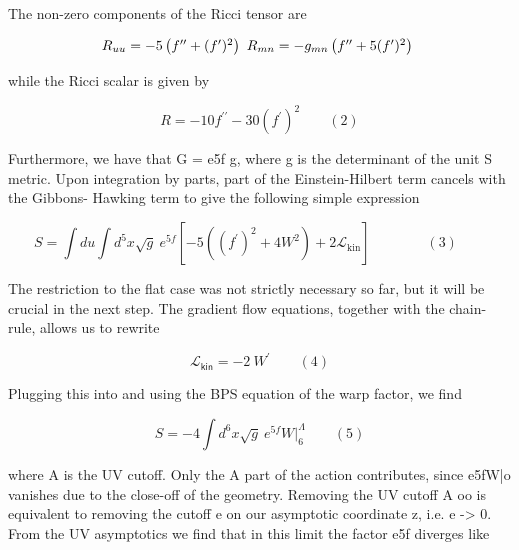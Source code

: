 \documentclass{article}
\begin{document}
\sloppy

The non-zero components of the Ricci tensor are


\begin{equation}
\begin{array} { c c c } { R _ { u u } = - 5 \left ( f ^ { \prime \prime } + ( f ^ { \prime } ) ^ { 2 } \right ) ~ R _ { m n } = - g _ { m n } \left ( f ^ { \prime \prime } + 5 ( f ^ { \prime } ) ^ { 2 } \right ) ~ }\end{array}
\end{equation}


while the Ricci scalar is given by


\begin{equation}
R = - 1 0 f ^ { \prime \prime } - 3 0 ( f ^ { \prime } ) ^ { 2 } \qquad ( 2 )
\end{equation}


Furthermore, we have that G = e5f g, where g is the determinant of the unit S metric.
Upon integration by parts, part of the Einstein-Hilbert term cancels with the Gibbons-
Hawking term to give the following simple expression


\begin{equation}
S = \int d u \int d ^ { 5 } x \sqrt { g } ~ e ^ { 5 f } \left [ - 5 \left ( ( f ^ { \prime } ) ^ { 2 } + 4 W ^ { 2 } \right ) + 2 \mathcal { L } _ { \mathrm { k i n } } \right ] \qquad \qquad ( 3 ) \qquad
\end{equation}


The restriction to the flat case was not strictly necessary so far, but it will be crucial in the
next step. The gradient flow equations, together with the chain-rule, allows us to rewrite


\begin{equation}
\mathcal { L } _ \mathsf { k i n } = - 2 ~ W ^ { \prime } \qquad ( 4 )
\end{equation}


Plugging this into and using the BPS equation of the warp factor, we find


\begin{equation}
S = - 4 \int d ^ { 6 } \! x \sqrt { g } ~ e ^ { 5 f } W \Big | _ { 6 } ^ { \Lambda } \qquad ( 5 )
\end{equation}


where A is the UV cutoff. Only the A part of the action contributes, since e5fW|o vanishes
due to the close-off of the geometry. Removing the UV cutoff A  oo is equivalent to
removing the cutoff e on our asymptotic coordinate z, i.e. e -> 0. From the UV asymptotics
we find that in this limit the factor e5f diverges like
\end{document}
